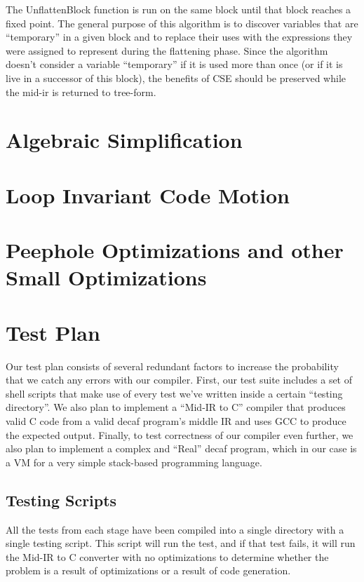 \documentclass[11pt]{article}
\begin{document}
\noindent The UnflattenBlock function is run on the same block until that block
reaches a fixed point. The general purpose of this algorithm is to
discover variables that are ``temporary'' in a given block and to replace
their uses with the expressions they were assigned to represent during
the flattening phase. Since the algorithm doesn't consider a variable
``temporary'' if it is used more than once (or if it is live in a
successor of this block), the benefits of CSE should be preserved
while the mid-ir is returned to tree-form. 


\section {Algebraic Simplification}
\label{sec:algebra}

\section {Loop Invariant Code Motion}
\label{sec:codehoist}

\section {Peephole Optimizations and other Small Optimizations}
\label{sec:peephole}

\section {Test Plan}
\label{sec:test}

Our test plan consists of several redundant factors to increase the
probability that we catch any errors with our compiler. First, our
test suite includes a set of shell scripts that make use of every test
we've written inside a certain ``testing directory''. We also plan to
implement a ``Mid-IR to C'' compiler that produces valid C code from a
valid decaf program's middle IR and uses GCC to produce the expected
output. Finally, to test correctness of our compiler even further, we
also plan to implement a complex and ``Real'' decaf program, which in
our case is a VM for a very simple stack-based programming language.

\subsection {Testing Scripts}

All the tests from each stage have been compiled into a single
directory with a single testing script. This script will run the test,
and if that test fails, it will run the Mid-IR to C converter with no
optimizations to determine whether the problem is a result of
optimizations or a result of code generation. 
\end{document}
